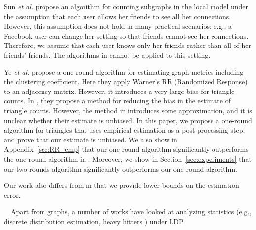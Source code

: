 Sun \textit{et al.} \cite{Sun_CCS19} propose an algorithm for counting subgraphs in the local model under the assumption that each user allows her friends to see all her connections. 
However, this assumption does not hold in many practical scenarios; e.g., a Facebook user can change her setting so that friends cannot see her connections. Therefore, we assume that each user knows only her friends rather than all of her friends' friends. 
The algorithms in \cite{Sun_CCS19} cannot be applied to this setting.

Ye \textit{et al.} \cite{Ye_ICDE20} propose a one-round algorithm for estimating graph metrics including the clustering coefficient. 
Here they apply Warner's RR (Randomized Response) to an adjacency matrix. 
However, it introduces a very large bias for triangle counts.
In \cite{Ye_TKDE21}, they propose a method for reducing the bias in the estimate of triangle counts. 
However, the method in \cite{Ye_TKDE21} introduces some approximation, and it is unclear whether their estimate is unbiased. 
In this paper, we propose a one-round algorithm for triangles that uses empirical estimation as a post-processing step, and prove that our estimate is unbiased. 
We also show in Appendix~\ref{sec:RR_emp} that our one-round algorithm significantly outperforms the one-round algorithm in \cite{Ye_ICDE20}. 
Moreover, we show in Section~\ref{sec:experiments} that our two-rounds algorithm significantly outperforms our one-round algorithm.

Our work also differs from \cite{Sun_CCS19,Ye_ICDE20,Ye_TKDE21} in that we provide lower-bounds on the estimation error.


\smallskip
{}~~Apart from graphs, a number of works have looked at analyzing statistics (e.g., discrete distribution estimation\cite{Acharya_AISTATS19,Fanti_PoPETs16,Kairouz_ICML16,Kairouz_JMLR16,Murakami_USENIX19,Wang_USENIX17,Ye_ISIT17}, 
heavy hitters \cite{Bassily_STOC15,Bassily_NIPS17,Qin_CCS16}) under LDP. 

